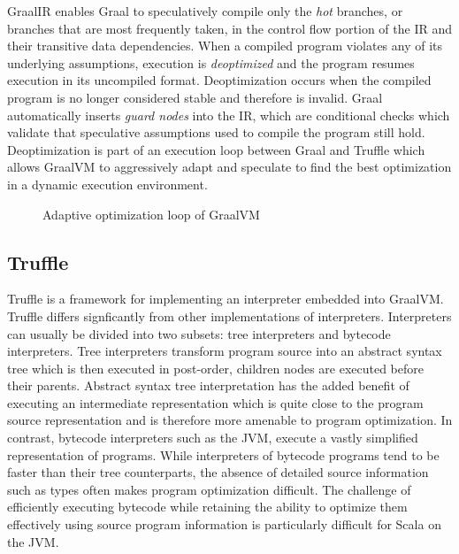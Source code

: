 GraalIR enables Graal to speculatively compile only the \textit{hot} branches\cite{graalvm:speculative-ir}, or branches that are most frequently taken, in the control flow portion of the IR and their transitive data dependencies.
When a compiled program violates any of its underlying assumptions, execution is \textit{deoptimized}\cite{self:deoptimization} and the program resumes execution in its uncompiled format.
Deoptimization occurs when the compiled program is no longer considered stable and therefore is invalid.
Graal automatically inserts \textit{guard nodes} into the IR, which are conditional checks which validate that speculative assumptions used to compile the program still hold.
Deoptimization is part of an execution loop between Graal and Truffle which allows GraalVM to aggressively adapt and speculate to find the best optimization in a dynamic execution environment.

\begin{figure}[!htb]
	\centering
	\caption{Adaptive optimization loop of GraalVM}
	\label{diagram:graal-loop}
\end{figure}

\subsection{Truffle}

Truffle is a framework for implementing an interpreter embedded into GraalVM.
Truffle differs signficantly from other implementations of interpreters.
Interpreters can usually be divided into two subsets: tree interpreters and bytecode interpreters.
Tree interpreters transform program source into an abstract syntax tree which is then executed in post-order, children nodes are executed before their parents.
Abstract syntax tree interpretation has the added benefit of executing an intermediate representation which is quite close to the program source representation and is therefore more amenable to program optimization.
In contrast, bytecode interpreters such as the JVM, execute a vastly simplified representation of programs.
While interpreters of bytecode programs tend to be faster than their tree counterparts, the absence of detailed source information such as types often makes program optimization difficult.
The challenge of efficiently executing bytecode while retaining the ability to optimize them effectively using source program information is particularly difficult for Scala on the JVM. 

